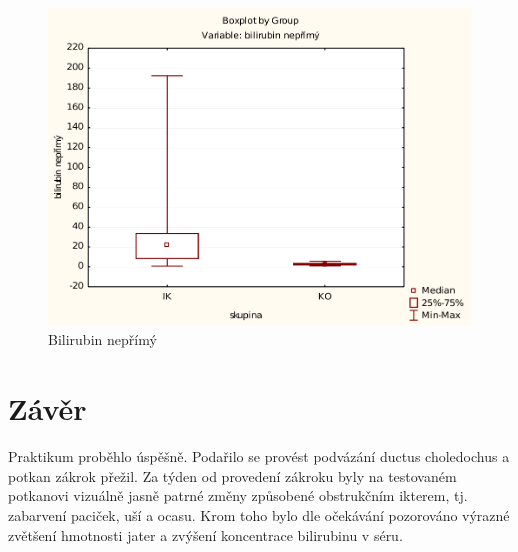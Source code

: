\documentclass[12pt]{article}
\begin{document}
\begin{figure}[ht!]
	\begin{centering}
	\includegraphics[width=\linewidth]{bilirubin-neprimy.pdf}
	\caption{Bilirubin nepřímý}
	\end{centering}
\end{figure}

\section{Závěr}
Praktikum proběhlo úspěšně. Podařilo se provést podvázání ductus choledochus a potkan zákrok přežil. Za týden od provedení zákroku byly na testovaném potkanovi vizuálně jasně patrné změny způsobené obstrukčním ikterem, tj. zabarvení paciček, uší a ocasu. Krom toho bylo dle očekávání pozorováno výrazné zvětšení hmotnosti jater a zvýšení koncentrace bilirubinu v séru.
\end{document}
